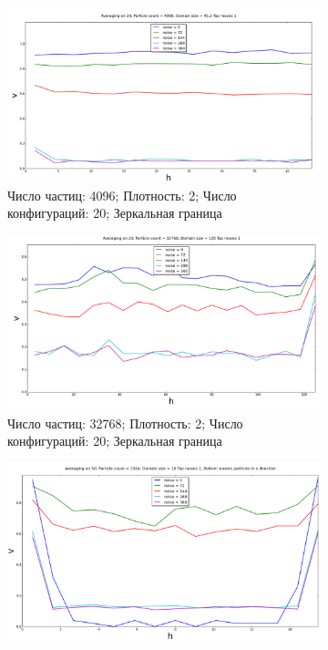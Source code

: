 \begin{figure}
    \centering
        \begin{subfigure}{\textwidth}
        \centering
            \includegraphics[height=0.25\textheight]{Images/4k_x20}
            \caption{Число частиц: 4096; Плотность: 2; Число конфигураций: 20; Зеркальная граница}
            \label{fig:Results:32k}
        \end{subfigure}
        \begin{subfigure}{\textwidth}
        \centering
            \includegraphics[height=0.25\textheight]{Images/32k_x20}
            \caption{Число частиц: 32768; Плотность: 2; Число конфигураций: 20; Зеркальная граница}
            \label{fig:Results:32kOld}
        \end{subfigure}
        \begin{subfigure}{\textwidth}
        \centering
            \includegraphics[height=0.25\textheight]{Images/1k_x50_NotMirror}

\end{subfigure}
\end{figure}
